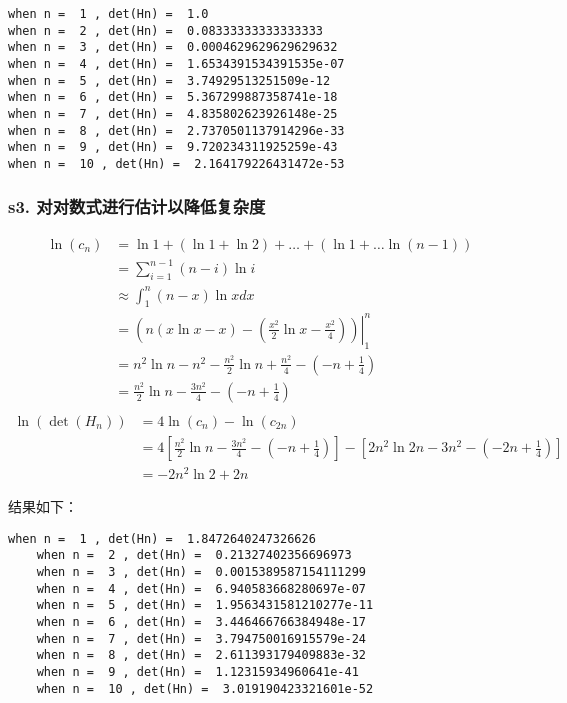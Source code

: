 \documentclass[11pt]{article}
\begin{document}
    \begin{Verbatim}[commandchars=\\\{\}]
when n =  1 , det(Hn) =  1.0
when n =  2 , det(Hn) =  0.08333333333333333
when n =  3 , det(Hn) =  0.0004629629629629632
when n =  4 , det(Hn) =  1.6534391534391535e-07
when n =  5 , det(Hn) =  3.74929513251509e-12
when n =  6 , det(Hn) =  5.367299887358741e-18
when n =  7 , det(Hn) =  4.835802623926148e-25
when n =  8 , det(Hn) =  2.7370501137914296e-33
when n =  9 , det(Hn) =  9.720234311925259e-43
when n =  10 , det(Hn) =  2.164179226431472e-53
    \end{Verbatim}

\subsubsection*{s3. 对对数式进行估计以降低复杂度}

\begin{equation}
	\begin{aligned}
		\ln(c_n)&=\ln1+(\ln1+\ln2)+…+(\ln1+…\ln(n-1))\\
		&=\sum\limits_{i=1}^{n-1}(n-i)\ln i\\
		&\approx\int_{1}^{n}(n-x)\ln xdx\\
		&=\left. (n(x\ln x-x)-(\frac{x^2}{2} \ln{x}-\frac{x^2}{4}))\right|_{1}^{n}\\
		&=n^2\ln n-n^2-\frac{n^2}{2} \ln{n}+\frac{n^2}{4}-(-n+\frac{1}{4})\\
		&=\frac{n^2}{2} \ln n -\frac{3n^2}{4}-(-n+\frac{1}{4})\\
	\end{aligned}
\end{equation}
\begin{equation}
	\begin{aligned}
		\ln (\det(H_n)) &= 4 \ln(c_n) - \ln(c_{2n})\\
		&= 4\left[\frac{n^2}{2} \ln n -\frac{3n^2}{4}-(-n+\frac{1}{4})\right]-\left[2n^2 \ln 2n -3n^2-(-2n+\frac{1}{4})\right]\\
		&=-2n^2 \ln 2+2n
	\end{aligned}
\end{equation}

结果如下：
\begin{Verbatim}[commandchars=\\\{\}]
	when n =  1 , det(Hn) =  1.8472640247326626
	when n =  2 , det(Hn) =  0.21327402356696973
	when n =  3 , det(Hn) =  0.0015389587154111299
	when n =  4 , det(Hn) =  6.940583668280697e-07
	when n =  5 , det(Hn) =  1.9563431581210277e-11
	when n =  6 , det(Hn) =  3.446466766384948e-17
	when n =  7 , det(Hn) =  3.794750016915579e-24
	when n =  8 , det(Hn) =  2.611393179409883e-32
	when n =  9 , det(Hn) =  1.12315934960641e-41
	when n =  10 , det(Hn) =  3.019190423321601e-52
\end{Verbatim}
\end{document}
